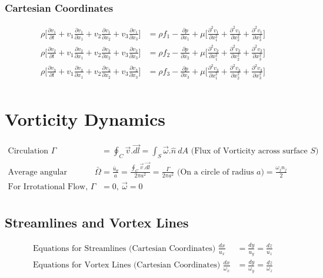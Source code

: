 \documentclass[10pt, letterpaper, notitlepage, landscape]{article}
\begin{document}
\subsubsection{Cartesian Coordinates}
\begin{align*}
\rho \biggl[ \frac{\partial v_1}{\partial t} + v_1 \frac{\partial v_1}{\partial x_1} + v_2 \frac{\partial v_1}{\partial x_2} + v_3 \frac{\partial v_1}{\partial x_3} \biggr] &= \rho f_1 - \frac{\partial p}{\partial x_1} + \mu \biggl[ \frac{\partial^2 v_1}{\partial x^2_1} + \frac{\partial^2 v_1}{\partial x^2_2} + \frac{\partial^2 v_1}{\partial x^2_3} \biggr] \\
\rho \biggl[ \frac{\partial v_2}{\partial t} + v_1 \frac{\partial v_2}{\partial x_1} + v_2 \frac{\partial v_2}{\partial x_2} + v_3 \frac{\partial v_2}{\partial x_3} \biggr] &= \rho f_2 - \frac{\partial p}{\partial x_2} + \mu \biggl[ \frac{\partial^2 v_2}{\partial x^2_1} + \frac{\partial^2 v_2}{\partial x^2_2} + \frac{\partial^2 v_2}{\partial x^2_3} \biggr] \\
\rho \biggl[ \frac{\partial v_3}{\partial t} + v_1 \frac{\partial v_3}{\partial x_1} + v_2 \frac{\partial v_3}{\partial x_2} + v_3 \frac{\partial v_3}{\partial x_3} \biggr] &= \rho f_3 - \frac{\partial p}{\partial x_3} + \mu \biggl[ \frac{\partial^2 v_3}{\partial x^2_1} + \frac{\partial^2 v_3}{\partial x^2_2} + \frac{\partial^2 v_3}{\partial x^2_3} \biggr] \\
\end{align*}
  

\section{Vorticity Dynamics}
\begin{align*}
\text{Circulation } \Gamma &= \oint_{C}^{} \vec{v} . \vec{dl} = \int_{S}^{} \vec{\omega}.\hat{n}\ dA \text{ (Flux of Vorticity across surface } S \text{)}\\ 
\text{Average angular velocity } \bar{\Omega} &= \frac{\bar{u}_{\theta}}{a} = \frac{\oint_{C}^{} \vec{v}.\vec{dl}}{2 \pi a^2} =  \frac{\Gamma}{2 \pi a^2} \text{ (On a circle of radius } a\text{)} = \frac{{\omega}_j n_j}{2}\\
\text{For Irrotational Flow, } \Gamma &= 0,\ \vec{\omega} = 0 \\
\end{align*}

\subsection{Streamlines and Vortex Lines}
\begin{align*}
\text{Equations for Streamlines (Cartesian Coordinates) } \frac{dx}{u_x} &= \frac{dy}{u_y} = \frac{dz}{u_z} \\
\text{Equations for Vortex Lines (Cartesian Coordinates) } \frac{dx}{\omega_x} &= \frac{dy}{\omega_y} = \frac{dz}{\omega_z} \\
\end{align*}
\end{document}
